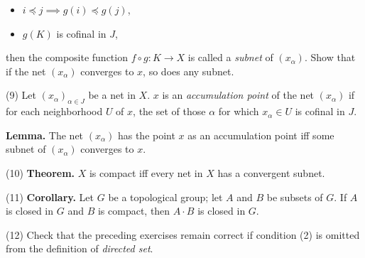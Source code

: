 \documentclass[a4paper]{article}
\begin{document}
\begin{itemize}
    \item $i \preceq j \implies g(i) \preceq g(j)$,
    \item $g(K)$ is cofinal in $J$,
\end{itemize}

then the composite function $f \circ g : K \to X$ is called a \emph{subnet} of $(x_\alpha)$. Show that if the net $(x_\alpha)$ converges to $x$, so does any subnet.

(9) Let $(x_\alpha)_{\alpha \in J}$ be a net in $X$. $x$ is an \emph{accumulation point} of the net $(x_\alpha)$ if for each neighborhood $U$ of $x$, the set of those $\alpha$ for which $x_\alpha \in U$ is cofinal in $J$.

\textbf{Lemma.} The net $(x_\alpha)$ has the point $x$ as an accumulation point iff some subnet of $(x_\alpha)$ converges to $x$.

(10) \textbf{Theorem.} $X$ is compact iff every net in $X$ has a convergent subnet.

(11) \textbf{Corollary.} Let $G$ be a topological group; let $A$ and $B$ be subsets of $G$. If $A$ is closed in $G$ and $B$ is compact, then $A \cdot B$ is closed in $G$.

(12) Check that the preceding exercises remain correct if condition (2) is omitted from the definition of \emph{directed set}.
\end{document}
